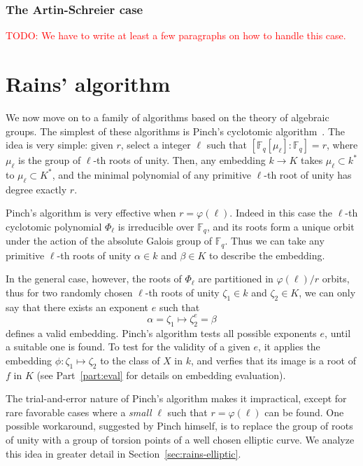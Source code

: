 \documentclass[12pt]{article}
\theoremstyle{plain}
\theoremstyle{definition}
\newcommand{\todo}[1]{\textcolor{red}{TODO: #1}}
\def\F{\ensuremath{\mathbb{F}}}
\def\euler{\ensuremath{\varphi}}
\newcounter{algorithm}
\begin{document}
\subsubsection{The Artin-Schreier case}
\label{sec:artin-schreier-case}

\todo{We have to write at least a few paragraphs on how to handle this case.}

\section{Rains' algorithm}

We now move on to a family of algorithms based on the theory of
algebraic groups. The simplest of these algorithms is Pinch's
cyclotomic algorithm~\cite{Pinch}. The idea is very simple: given $r$,
select a integer $\ell$ such that $[\F_q[\mu_\ell]:\F_q]=r$, where
$\mu_\ell$ is the group of $\ell$-th roots of unity.  Then, any
embedding $k\to K$ takes $\mu_\ell\subset k^\ast$ to $\mu_\ell\subset
K^\ast$, and the minimal polynomial of any primitive $\ell$-th root of
unity has degree exactly $r$.

Pinch's algorithm is very effective when $r=\euler(\ell)$. Indeed in
this case the $\ell$-th cyclotomic polynomial $\Phi_\ell$ is
irreducible over $\F_q$, and its roots form a unique orbit under the
action of the absolute Galois group of $\F_q$. Thus we can take any
primitive $\ell$-th roots of unity $\alpha\in k$ and $\beta\in K$ to
describe the embedding.

In the general case, however, the roots of $\Phi_\ell$ are partitioned
in $\euler(\ell)/r$ orbits, thus for two randomly chosen $\ell$-th
roots of unity $\zeta_1\in k$ and $\zeta_2\in K$, we can only say that
there exists an exponent $e$ such that
\begin{equation*}
  \alpha = \zeta_1 \mapsto \zeta_2^e = \beta
\end{equation*}
defines a valid embedding. Pinch's algorithm tests all possible
exponents $e$, until a suitable one is found. To test for the validity
of a given $e$, it applies the embedding $\phi:\zeta_1\mapsto\zeta_2$
to the class of $X$ in $k$, and verfies that its image is a root of
$f$ in $K$ (see Part~\ref{part:eval} for details on embedding
evaluation).

The trial-and-error nature of Pinch's algorithm makes it impractical,
except for rare favorable cases where a \emph{small} $\ell$ such that
$r=\euler(\ell)$ can be found. One possible workaround, suggested by
Pinch himself, is to replace the group of roots of unity with a group
of torsion points of a well chosen elliptic curve. We analyze this
idea in greater detail in Section~\ref{sec:rains-elliptic}.
\end{document}
